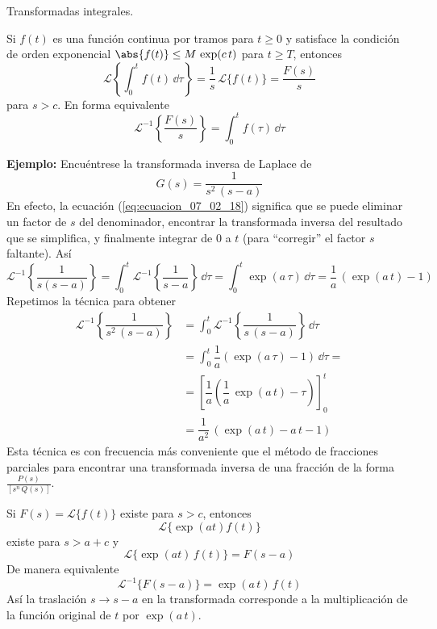 \begin{teo}{Transformadas integrales.}

Si $f(t)$ es una función continua por tramos para $t \geq 0$ y satisface la condición de orden exponencial $\abs{f(t)} \leq M \, \exp(c \, t)$ para $t \geq T $, entonces
\begin{equation}
\mathscr{L} \left\{ \int_{0}^{t} f(t) \, \dd \tau \right\} = \dfrac{1}{s} \, \mathscr{L} \{ f(t) \} = \dfrac{F(s)}{s}
\label{eq:ecuacion_07_02_17}
\end{equation}
para $s > c$. En forma equivalente 
\begin{equation}
\mathscr{L}^{-1} \left\{ \dfrac{F(s)}{s} \right\} = \int_{0}^{t} f(\tau) \, \dd \tau
\label{eq:ecuacion_07_02_18}
\end{equation} 
\end{teo}
\textbf{Ejemplo: } Encuéntrese la transformada inversa de Laplace de
\[ G(s) = \dfrac{1}{s^{2} \, (s - a)} \]
En efecto, la ecuación (\ref{eq:ecuacion_07_02_18}) significa que se puede eliminar un factor de $s$ del denominador, encontrar la transformada inversa del resultado que se simplifica, y finalmente integrar de $0$ a $t$ (para \enquote{corregir} el factor $s$ faltante). Así
\[ \mathscr{L}^{-1} \left\{  \dfrac{1}{s (s-a)} \right\} = \int_{0}^{t} \mathscr{L}^{-1} \left\{ \dfrac{1}{s-a} \right\}  \, \dd \tau  = \int_{0}^{t} \exp(a \, \tau) \, \dd \tau  = \dfrac{1}{a} \, (\exp(a \, t) - 1) \]
Repetimos la técnica para obtener
\begin{align*}
\mathscr{L}^{-1} \left\{  \dfrac{1}{s^{2} \, (s-a)} \right\} &= \int_{0}^{t} \mathscr{L}^{-1} \left\{ \dfrac{1}{s \, (s-a)} \right\} \, \dd \tau  \\[0.5em]
&= \int_{0}^{t} \dfrac{1}{a} (\exp(a \, \tau) - 1) \, \dd \tau  = \\[0.5em]
&= \left[ \dfrac{1}{a} \left( \dfrac{1}{a} \, \exp(a \, t) - \tau \right) \right]_{0}^{t} \\[0.5em]
&= \dfrac{1}{a^{2}} \, (\exp(a \, t) - a \, t - 1)
\end{align*}
Esta técnica es con frecuencia más conveniente que el método de fracciones parciales para encontrar una transformada inversa de una fracción de la forma $\displaystyle \frac{P(s)}{[s^{n} \, Q(s)]}$.
\begin{teo}
Si $F(s) = \mathscr{L} \{ f(t) \}$ existe para $s > c$, entonces  
\[ \mathscr{L} \{\exp(at) f(t) \} \]
existe para $s > a + c$ y
\[ \mathscr{L} \{ \exp(at) \, f(t) \} = F(s - a) \]
De manera equivalente
\[ \mathscr{L}^{-1} \{ F(s - a) \} = \exp(a \, t) \, f(t) \]
Así la traslación $s \to s - a$ en la transformada corresponde a la multiplicación de la función original de $t$ por $\exp(a \, t)$.
\end{teo}
